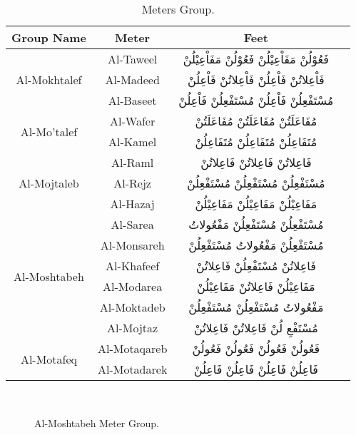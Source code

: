 \begin{itemize}
  \begin{table}[t]
    \centering
    \begin{tabular}{c c c c}
      \toprule
      \textbf{Group Name} & \textbf{Meter}  & \textbf{Feet} \\
      \toprule
      \multirow{3}{*}{Al-Mokhtalef} & Al-Taweel & \textarabic{فَعُوْلُنْ مَفَاْعِيْلُنْ فَعُوْلُنْ مَفَاْعِيْلُنْ}\\
                          & Al-Madeed&  \textarabic{فَاْعِلاتُنْ فَاْعِلُنْ فَاْعِلاتُنْ فَاْعِلُنْ}\\
                          & Al-Baseet  & \textarabic{مُسْتَفْعِلُنْ فَاْعِلُنْ مُسْتَفْعِلُنْ فَاْعِلُنْ}\\
      \midrule
      \multirow{2}{*}{Al-Mo'talef} & Al-Wafer & \textarabic{مُفَاعَلَتُنْ مُفَاعَلَتُنْ مُفَاعَلَتُنْ}\\
                          & Al-Kamel&  \textarabic{مُتَفَاعِلُنْ مُتَفَاعِلُنْ مُتَفَاعِلُنْ}\\
      \midrule
      \multirow{3}{*}{Al-Mojtaleb} & Al-Raml & \textarabic{فَاعِلاتُنْ فَاعِلاتُنْ فَاعِلاتُنْ}\\
                          & Al-Rejz&  \textarabic{مُسْتَفْعِلُنْ مُسْتَفْعِلُنْ مُسْتَفْعِلُنْ}\\
                          & Al-Hazaj  & \textarabic{مَفَاعِيْلُنْ مَفَاعِيْلُنْ مَفَاعِيْلُنْ}\\
      \midrule
      \multirow{6}{*}{Al-Moshtabeh} & Al-Sarea & \textarabic{مُسْتَفْعِلُنْ مُسْتَفْعِلُنْ مَفْعُولاتُ}\\
                          & Al-Monsareh&  \textarabic{مُسْتَفْعِلُنْ مَفْعُولاتُ مُسْتَفْعِلُنْ}\\
                          & Al-Khafeef  & \textarabic{فَاعِلاتُنْ مُسْتَفْعِلُنْ فَاعِلاتُنْ}\\
                          & Al-Modarea  & \textarabic{مَفَاعِيْلُنْ فَاعِلاتُنْ مَفَاعِيْلُنْ}\\
                          & Al-Moktadeb  & \textarabic{مَفْعُولاتُ مُسْتَفْعِلُنْ مُسْتَفْعِلُنْ}\\
                          & Al-Mojtaz  & \textarabic{مُسْتَفْعِ لُنْ فَاعِلاتُنْ فَاعِلاتُنْ}\\
      \midrule
      \multirow{2}{*}{Al-Motafeq} & Al-Motaqareb & \textarabic{فَعُولُنْ فَعُولُنْ فَعُولُنْ فَعُولُنْ}\\
                          & Al-Motadarek&  \textarabic{فَاعِلُنْ فَاعِلُنْ فَاعِلُنْ فَاعِلُنْ}\\
      \bottomrule                                           
    \end{tabular}
    \caption{Meters Group.}\label{Tab:Meters_Group}
  \end{table}%
\end{itemize}
% 
\begin{figure}[h]
  \centering
  
  \caption{Al-Moshtabeh Meter Group.}~\label{Fig:AlMoshtabeh}
\end{figure}%

